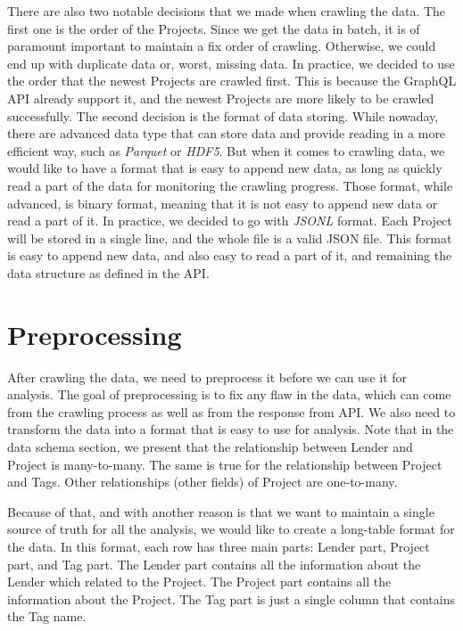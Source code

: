 There are also two notable decisions that we made when crawling the data.
The first one is the order of the Projects.
Since we get the data in batch, it is of paramount important to maintain a fix order of crawling.
Otherwise, we could end up with duplicate data or, worst, missing data.
In practice, we decided to use the order that the newest Projects are crawled first.
This is because the GraphQL API already support it, and the newest Projects are more likely to be crawled successfully.
The second decision is the format of data storing.
While nowaday, there are advanced data type that can store data and provide reading in a more efficient way,
such as \textit{Parquet}\cite{parquet} or \textit{HDF5}\cite{hdf5}.
But when it comes to crawling data, we would like to have a format that is easy to append new data,
as long as quickly read a part of the data for monitoring the crawling progress.
Those format, while advanced, is binary format, meaning that it is not easy to append new data or read a part of it.
In practice, we decided to go with \textit{JSONL} format.
Each Project will be stored in a single line, and the whole file is a valid JSON file.
This format is easy to append new data, and also easy to read a part of it, and remaining the data structure as defined in the API.

\section{Preprocessing}

After crawling the data, we need to preprocess it before we can use it for analysis.
The goal of preprocessing is to fix any flaw in the data, which can come from the crawling process as well as from the response from API.
We also need to transform the data into a format that is easy to use for analysis.
Note that in the data schema section, we present that the relationship between Lender and Project is many-to-many.
The same is true for the relationship between Project and Tags.
Other relationships (other fields) of Project are one-to-many.

Because of that, and with another reason is that we want to maintain a single source of truth for all the analysis,
we would like to create a long-table format for the data.
In this format, each row has three main parts: Lender part, Project part, and Tag part.
The Lender part contains all the information about the Lender which related to the Project.
The Project part contains all the information about the Project.
The Tag part is just a single column that contains the Tag name.


